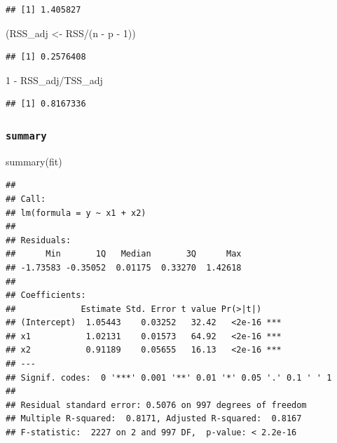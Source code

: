 \documentclass[
  12pt,
]{book}
\newenvironment{Shaded}{\begin{snugshade}}{\end{snugshade}}
\newcommand{\DecValTok}[1]{\textcolor[rgb]{0.00,0.00,0.81}{#1}}
\newcommand{\FunctionTok}[1]{\textcolor[rgb]{0.00,0.00,0.00}{#1}}
\newcommand{\NormalTok}[1]{#1}
\newcommand{\OtherTok}[1]{\textcolor[rgb]{0.56,0.35,0.01}{#1}}
\newcommand{\SpecialCharTok}[1]{\textcolor[rgb]{0.00,0.00,0.00}{#1}}
\theoremstyle{definition}
\theoremstyle{definition}
\theoremstyle{definition}
\theoremstyle{definition}
\theoremstyle{remark}
\begin{document}
\begin{verbatim}
## [1] 1.405827
\end{verbatim}

\begin{Shaded}
\begin{Highlighting}[]
\NormalTok{(RSS\_adj }\OtherTok{\textless{}{-}}\NormalTok{ RSS}\SpecialCharTok{/}\NormalTok{(n }\SpecialCharTok{{-}}\NormalTok{ p }\SpecialCharTok{{-}} \DecValTok{1}\NormalTok{))}
\end{Highlighting}
\end{Shaded}

\begin{verbatim}
## [1] 0.2576408
\end{verbatim}

\begin{Shaded}
\begin{Highlighting}[]
\DecValTok{1} \SpecialCharTok{{-}}\NormalTok{ RSS\_adj}\SpecialCharTok{/}\NormalTok{TSS\_adj}
\end{Highlighting}
\end{Shaded}

\begin{verbatim}
## [1] 0.8167336
\end{verbatim}

\hypertarget{summary}{%
\subsubsection{\texorpdfstring{\texttt{summary}}{summary}}\label{summary}}

\begin{Shaded}
\begin{Highlighting}[]
\FunctionTok{summary}\NormalTok{(fit)}
\end{Highlighting}
\end{Shaded}

\begin{verbatim}
## 
## Call:
## lm(formula = y ~ x1 + x2)
## 
## Residuals:
##      Min       1Q   Median       3Q      Max 
## -1.73583 -0.35052  0.01175  0.33270  1.42618 
## 
## Coefficients:
##             Estimate Std. Error t value Pr(>|t|)    
## (Intercept)  1.05443    0.03252   32.42   <2e-16 ***
## x1           1.02131    0.01573   64.92   <2e-16 ***
## x2           0.91189    0.05655   16.13   <2e-16 ***
## ---
## Signif. codes:  0 '***' 0.001 '**' 0.01 '*' 0.05 '.' 0.1 ' ' 1
## 
## Residual standard error: 0.5076 on 997 degrees of freedom
## Multiple R-squared:  0.8171, Adjusted R-squared:  0.8167 
## F-statistic:  2227 on 2 and 997 DF,  p-value: < 2.2e-16
\end{verbatim}
\end{document}
